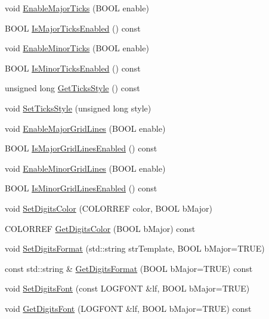 \begin{DoxyCompactItemize}
void \hyperlink{class_axis_a7a6d9bb7ea73f134a7bcdc7839f2fea9}{Enable\-Major\-Ticks} (B\-O\-O\-L enable)
\item 
B\-O\-O\-L \hyperlink{class_axis_a49f99f12afbbe0c3d1feaced4a7ebcc2}{Is\-Major\-Ticks\-Enabled} () const 
\item 
void \hyperlink{class_axis_a51e4e998fdafb039b153824494ec1a64}{Enable\-Minor\-Ticks} (B\-O\-O\-L enable)
\item 
B\-O\-O\-L \hyperlink{class_axis_acb61ef0cfad74adcec76c0c3291fc98f}{Is\-Minor\-Ticks\-Enabled} () const 
\item 
unsigned long \hyperlink{class_axis_a87b08c86575f337d4d09a0b563c76288}{Get\-Ticks\-Style} () const 
\item 
void \hyperlink{class_axis_abbabc70a25f14345308300c67d50e177}{Set\-Ticks\-Style} (unsigned long style)
\item 
void \hyperlink{class_axis_ab23b8dbd121a233ebdabe77122a9c583}{Enable\-Major\-Grid\-Lines} (B\-O\-O\-L enable)
\item 
B\-O\-O\-L \hyperlink{class_axis_a6f037d316ea2e575f8f29fca4beea8ea}{Is\-Major\-Grid\-Lines\-Enabled} () const 
\item 
void \hyperlink{class_axis_a9d36b6a9039e776fa5e91856fd58eb1b}{Enable\-Minor\-Grid\-Lines} (B\-O\-O\-L enable)
\item 
B\-O\-O\-L \hyperlink{class_axis_a46bb27f688cf602a183d0e35e60d3aa8}{Is\-Minor\-Grid\-Lines\-Enabled} () const 
\item 
void \hyperlink{class_axis_a44245d3776209f0010cf91990b171699}{Set\-Digits\-Color} (C\-O\-L\-O\-R\-R\-E\-F color, B\-O\-O\-L b\-Major)
\item 
C\-O\-L\-O\-R\-R\-E\-F \hyperlink{class_axis_a6391e8f6e81eca01de870c0bbaeeb78f}{Get\-Digits\-Color} (B\-O\-O\-L b\-Major) const 
\item 
void \hyperlink{class_axis_aa5baf897c0a1d088ccc673dceba5bb66}{Set\-Digits\-Format} (std\-::string str\-Template, B\-O\-O\-L b\-Major=T\-R\-U\-E)
\item 
const std\-::string \& \hyperlink{class_axis_ad5126fa60e11694e569e382c27d53741}{Get\-Digits\-Format} (B\-O\-O\-L b\-Major=T\-R\-U\-E) const 
\item 
void \hyperlink{class_axis_a710bfe0545ca9ff2053115ca71618a2d}{Set\-Digits\-Font} (const L\-O\-G\-F\-O\-N\-T \&lf, B\-O\-O\-L b\-Major=T\-R\-U\-E)
\item 
void \hyperlink{class_axis_a3381bac80fdd67426366275d1e611877}{Get\-Digits\-Font} (L\-O\-G\-F\-O\-N\-T \&lf, B\-O\-O\-L b\-Major=T\-R\-U\-E) const 

\end{DoxyCompactItemize}
